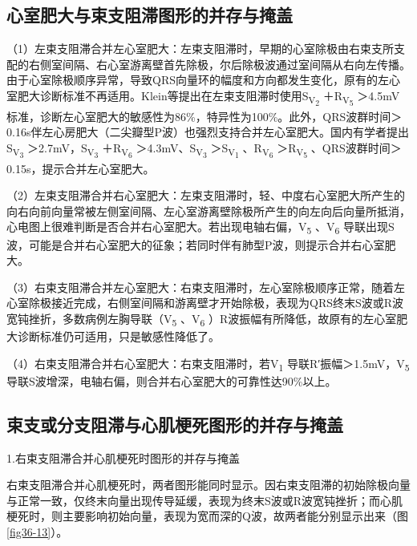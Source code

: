\protect\hypertarget{text00043.htmlux5cux23subid477}{}{}

\subsection{心室肥大与束支阻滞图形的并存与掩盖}

（1）左束支阻滞合并左心室肥大：左束支阻滞时，早期的心室除极由右束支所支配的右侧室间隔、右心室游离壁首先除极，尔后除极波通过室间隔从右向左传播。由于心室除极顺序异常，导致QRS向量环的幅度和方向都发生变化，原有的左心室肥大诊断标准不再适用。Klein等提出在左束支阻滞时使用S\textsubscript{V\textsubscript{2}}
＋R\textsubscript{V\textsubscript{5}}
＞4.5mV标准，诊断左心室肥大的敏感性为86\%，特异性为100\%。此外，QRS波群时间＞0.16s伴左心房肥大（二尖瓣型P波）也强烈支持合并左心室肥大。国内有学者提出S\textsubscript{V\textsubscript{3}}
＞2.7mV，S\textsubscript{V\textsubscript{3}}
＋R\textsubscript{V\textsubscript{6}}
＞4.3mV、S\textsubscript{V\textsubscript{3}}
＞S\textsubscript{V\textsubscript{1}}
、R\textsubscript{V\textsubscript{6}}
＞R\textsubscript{V\textsubscript{5}}
、QRS波群时间＞0.15s，提示合并左心室肥大。

（2）左束支阻滞合并右心室肥大：左束支阻滞时，轻、中度右心室肥大所产生的向右向前向量常被左侧室间隔、左心室游离壁除极所产生的向左向后向量所抵消，心电图上很难判断是否合并右心室肥大。若出现电轴右偏，V\textsubscript{5}
、V\textsubscript{6}
导联出现S波，可能是合并右心室肥大的征象；若同时伴有肺型P波，则提示合并右心室肥大。

（3）右束支阻滞合并左心室肥大：右束支阻滞时，左心室除极顺序正常，随着左心室除极接近完成，右侧室间隔和游离壁才开始除极，表现为QRS终末S波或R波宽钝挫折，多数病例左胸导联（V\textsubscript{5}
、V\textsubscript{6}
）R波振幅有所降低，故原有的左心室肥大诊断标准仍可适用，只是敏感性降低了。

（4）右束支阻滞合并右心室肥大：右束支阻滞时，若V\textsubscript{1}
导联R′振幅＞1.5mV，V\textsubscript{5}
导联S波增深，电轴右偏，则合并右心室肥大的可靠性达90\%以上。

\protect\hypertarget{text00043.htmlux5cux23subid478}{}{}

\subsection{束支或分支阻滞与心肌梗死图形的并存与掩盖}

1.右束支阻滞合并心肌梗死时图形的并存与掩盖

右束支阻滞合并心肌梗死时，两者图形能同时显示。因右束支阻滞的初始除极向量与正常一致，仅终末向量出现传导延缓，表现为终末S波或R波宽钝挫折；而心肌梗死时，则主要影响初始向量，表现为宽而深的Q波，故两者能分别显示出来（图\ref{fig36-13}）。

